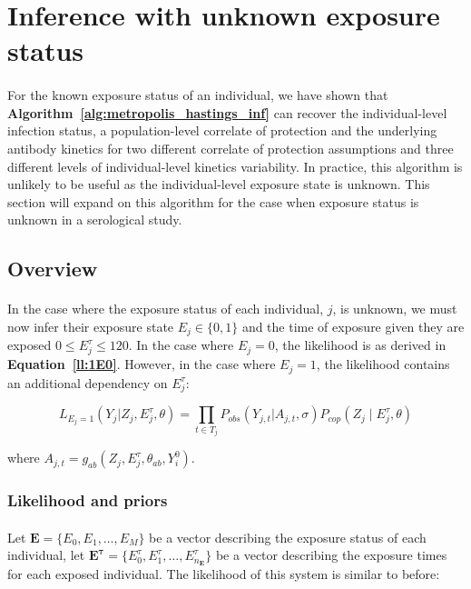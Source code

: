 
\section{Inference with unknown exposure status}

\paragraph{}For the known exposure status of an individual, we have shown that \textbf{Algorithm~\ref{alg:metropolis_hastings_inf}} can recover the individual-level infection status, a population-level correlate of protection and the underlying antibody kinetics for two different correlate of protection assumptions and three different levels of individual-level kinetics variability. In practice, this algorithm is unlikely to be useful as the individual-level exposure state is unknown. This section will expand on this algorithm for the case when exposure status is unknown in a serological study. 

\subsection{Overview}

\paragraph{}In the case where the exposure status of each individual, $j$, is unknown, we must now infer their exposure state $E_j \in \{0, 1\}$ and the time of exposure given they are exposed $0 \leq E_j^\tau \leq 120$. In the case where $E_j = 0$, the likelihood is as derived in \textbf{Equation~\ref{ll:1E0}}. However, in the case where $E_j = 1$, the likelihood contains an additional dependency on $E_j^\tau$:

\begin{equation}
L_{E_j = 1}(Y_{j}| Z_j, E_j^\tau, \theta) = \prod_{t \in T_j}P_{obs}(Y_{j,t}|A_{j,t}, \sigma)P_{cop}(Z_j \mid  E^\tau_{j}, \theta)
\end{equation}

where $A_{j,t} = g_{ab}( Z_j,  E_j^\tau, \theta_{ab}, Y^0_i) $.

\subsubsection{Likelihood and priors}

\paragraph{}Let $\mathbf{E} = \{E_0, E_1, \dots, E_{M}\}$ be a vector describing the exposure status of each individual, let $\mathbf{E^{\tau}} = \{E^{\tau}_0, E^{\tau}_1, \dots, E^{\tau}_{n_\mathbf{E}}\}$ be a vector describing the exposure times for each exposed individual. The likelihood of this system is similar to before:

